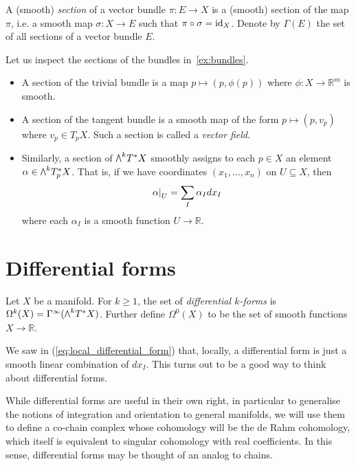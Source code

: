 \documentclass{article}
\begin{document}
\begin{definition}
  A  (smooth) \emph{section} of a vector bundle $\pi:E\to X$ is a (smooth)
  section of the map $\pi$, i.e. a smooth map $\sigma : X\to E$ such that $\pi
  \circ \sigma = \operatorname{id}_X$. Denote by $\Gamma(E)$ the set of all sections of
  a vector bundle $E$.
\end{definition}

\begin{example}
  Let us inspect the sections of the bundles in~\ref{ex:bundles}.
  \begin{itemize}
    \item A section of the trivial bundle is a map $p\mapsto (p,\phi(p))$ where $\phi:X\to\mathbb{R}^m$ is smooth.
    \item A section of the tangent bundle is a smooth map of the form
      $p\mapsto (p,v_p)$ where $v_p\in T_p X$. Such a section is called
      a \emph{vector field}.
    \item Similarly, a section of $\exterior{k}{T^* X}$ smoothly assigns to each
      $p\in X$ an element $\alpha\in\exterior{k}{T^*_p X}$. That is,
      if we have coordinates $(x_1,\ldots,x_n)$ on $U\subseteq X$,
      then
      \begin{align}\label{eq:local_differential_form}
        \left.{\alpha}\right\vert_{U} = \sum_I \alpha_I dx_I
      \end{align}
      where each $\alpha_I$ is a smooth function $U\to \mathbb{R}$.
  \end{itemize}
\end{example}

\section{Differential forms}

\begin{definition}
  Let $X$ be a manifold. For $k\geq 1$, the set of \emph{differential
  $k$-forms} is $\Omega^k(X) = \Gamma^\infty(\exterior{k}{T^* X})$.
  Further define $\Omega^0(X)$ to be the set of smooth functions
  $X\to\mathbb{R}$.
\end{definition}


We saw in (\ref{eq:local_differential_form}) that, locally, a differential
form is just a smooth linear combination of $dx_I$. This turns out
to be a good way to think about differential forms.

While differential forms are useful in their own right, in particular
to generalise the notions of integration and orientation to general
manifolds, we will use them to define a co-chain complex whose cohomology will be the de Rahm cohomology, which itself is equivalent to singular
cohomology with real coefficients. In this sense, differential forms
may be thought of an analog to chains.
\end{document}
